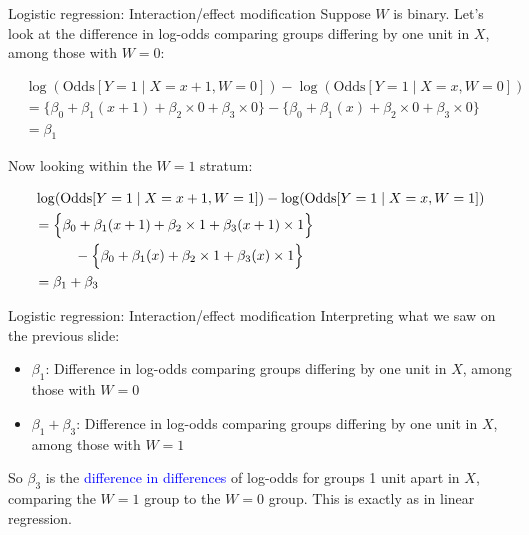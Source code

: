 \documentclass[10pt,t]{beamer}
\newcommand\tab[1][1cm]{\hspace*{#1}}
\begin{document}
\begin{frame}{Logistic regression: Interaction/effect modification}
	Suppose $W$ is binary. Let's look at the difference in log-odds comparing groups differing by one unit in $X$, among those with $W = 0$:
	\begin{small}
	\begin{align*}
		&\log(\text{Odds}[Y = 1 \mid X = x+1, W = 0]) - \log(\text{Odds}[Y = 1 \mid X = x, W = 0])\\
		&= \Big\{\beta_0 + \beta_1(x + 1) + \beta_2\times 0 + \beta_3 \times 0 \Big\}- \Big\{\beta_0 + \beta_1(x) + \beta_2\times 0 + \beta_3 \times 0\Big\}\\
		&= \beta_1 
	\end{align*}
	\end{small}\pause
 Now looking within the $W = 1$ stratum:
	\begin{small}
		\begin{align*}
					&\log(\text{Odds}[Y = 1 \mid X = x+1, W = 1]) - \log(\text{Odds}[Y = 1 \mid X = x, W = 1])\\
			&= \Big\{\beta_0 + \beta_1(x + 1) + \beta_2\times 1 + \beta_3(x+1) \times 1 \Big\}\\
			&\tab - \Big\{\beta_0 + \beta_1(x) + \beta_2\times 1 + \beta_3 (x)\times 1\Big\}\\
			&= \beta_1 + \beta_3
		\end{align*}
	\end{small}
\end{frame}

\begin{frame}{Logistic regression: Interaction/effect modification}
	Interpreting what we saw on the previous slide: \pause
	\begin{itemize}
		\item $\beta_1$: Difference in log-odds comparing groups differing by one unit in $X$, among those with $W = 0$\pause
		\item $\beta_1 + \beta_3$: Difference in log-odds comparing groups differing by one unit in $X$, among those with $W = 1$\pause
	\end{itemize}
So $\beta_3$ is the \textcolor{blue}{difference in differences} of log-odds for groups 1 unit apart in $X$, comparing the $W = 1$ group to the $W = 0$ group. This is exactly as in linear regression. 
\end{frame}
\end{document}
